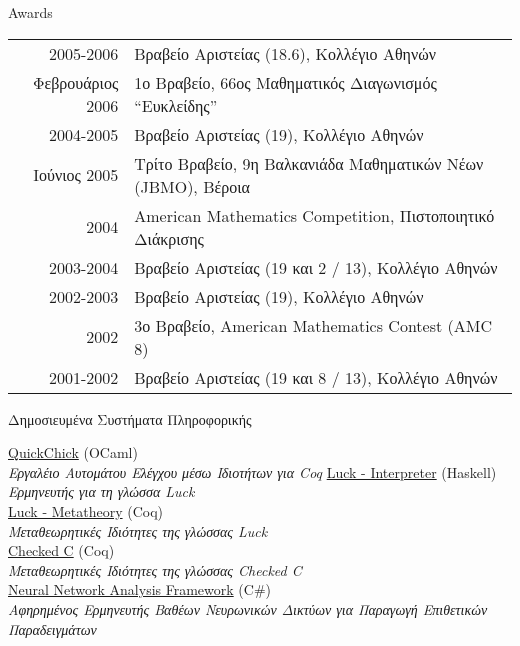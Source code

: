 \documentclass{resume} %
\begin{document}
\begin{rSection}{Awards}
\begin{longtable}{rl}
  2005-2006 &  \textgreek{Βραβείο Αριστείας (18.6), Κολλέγιο Αθηνών}\\
  \textgreek{Φεβρουάριος} 2006 & \textgreek{1ο Βραβείο, 66ος Μαθηματικός Διαγωνισμός ``Ευκλείδης''} \\  

  2004-2005 &  \textgreek{Βραβείο Αριστείας (19), Κολλέγιο Αθηνών}\\
  \textgreek{Ιούνιος} 2005 & \textgreek{Τρίτο Βραβείο, 9η Βαλκανιάδα Μαθηματικών Νέων} (JBMO), \textgreek{Βέροια}\\
  2004 &  American Mathematics Competition,  \textgreek{Πιστοποιητικό Διάκρισης}\\
  2003-2004 &  \textgreek{Βραβείο Αριστείας (19 και 2 / 13), Κολλέγιο Αθηνών}\\
  2002-2003 &  \textgreek{Βραβείο Αριστείας (19), Κολλέγιο Αθηνών}\\
  2002 & \textgreek{3ο Βραβείο}, American Mathematics Contest (AMC 8)\\
  2001-2002 &  \textgreek{Βραβείο Αριστείας (19 και 8 / 13), Κολλέγιο Αθηνών}\\
  
\end{longtable}

\end{rSection}


\begin{rSection}{\textgreek{Δημοσιευμένα Συστήματα Πληροφορικής}}

  \href{https://github.com/QuickChick/QuickChick}{QuickChick} (OCaml)\\
  \hspace*{2em} \emph{\textgreek{Εργαλέιο Αυτομάτου Ελέγχου μέσω Ιδιοτήτων για} Coq}
  \href {https://github.com/QuickChick/Luck/tree/master/luck}{Luck - Interpreter} (Haskell)\\
  \hspace*{2em} \emph{\textgreek{Ερμηνευτής για τη γλώσσα} Luck}\\
  \href{https://github.com/QuickChick/Luck/tree/master/coq}{Luck - Metatheory} (Coq)\\
  \hspace*{2em} \emph{\textgreek{Μεταθεωρητικές Ιδιότητες της γλώσσας} Luck}\\
  \href{https://github.com/plum-umd/checkedc/tree/master/coq}{Checked C} (Coq)\\
  \hspace*{2em} \emph{\textgreek{Μεταθεωρητικές Ιδιότητες της γλώσσας} Checked C}\\
  \href{https://github.com/microsoft/NeuralNetworkAnalysis}{Neural Network Analysis Framework} (C\#)\\
  \hspace*{2em} \emph{\textgreek{Αφηρημένος Ερμηνευτής Βαθέων Νευρωνικών Δικτύων για Παραγωγή Επιθετικών Παραδειγμάτων}}

\end{rSection}
\end{document}
